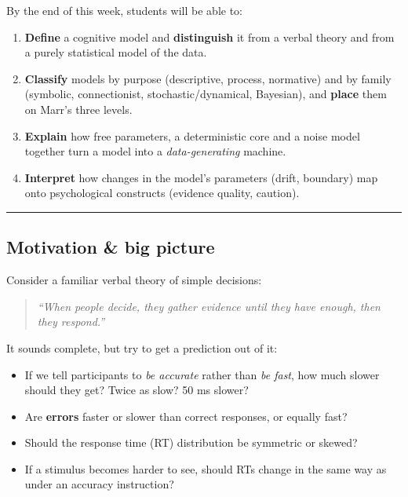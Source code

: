 By the end of this week, students will be able to:

\begin{enumerate}
\def\labelenumi{\arabic{enumi}.}
\tightlist
\item
  \textbf{Define} a cognitive model and \textbf{distinguish} it from a
  verbal theory and from a purely statistical model of the data.
\item
  \textbf{Classify} models by purpose (descriptive, process, normative)
  and by family (symbolic, connectionist, stochastic/dynamical,
  Bayesian), and \textbf{place} them on Marr's three levels.
\item
  \textbf{Explain} how free parameters, a deterministic core and a noise
  model together turn a model into a \emph{data-generating} machine.
\item
  \textbf{Interpret} how changes in the model's parameters (drift,
  boundary) map onto psychological constructs (evidence quality,
  caution).
\end{enumerate}

\begin{center}\rule{0.5\linewidth}{0.5pt}\end{center}

\subsection{Motivation \& big picture}

Consider a familiar verbal theory of simple decisions:

\begin{quote}
\emph{``When people decide, they gather evidence until they have enough,
then they respond.''}
\end{quote}

It sounds complete, but try to get a prediction out of it:

\begin{itemize}
\tightlist
\item
  If we tell participants to \emph{be accurate} rather than \emph{be
  fast}, how much slower should they get? Twice as slow? 50 ms slower?
\item
  Are \textbf{errors} faster or slower than correct responses, or
  equally fast?
\item
  Should the response time (RT) distribution be symmetric or skewed?
\item
  If a stimulus becomes harder to see, should RTs change in the same way
  as under an accuracy instruction?
\end{itemize}

